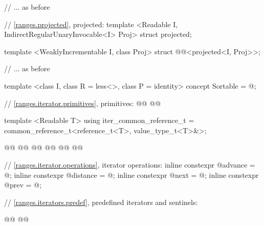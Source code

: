 \begin{codeblock}
{{    // ... as before

    // \ref{ranges.projected}, projected:
    template <Readable I, IndirectRegularUnaryInvocable<I> Proj>
    struct projected;

    template <WeaklyIncrementable I, class Proj>
    struct @@<projected<I, Proj>>;

    // ... as before

    template <class I, class R = less<>, class P = identity>
    concept Sortable = @\seebelow@;

    // \ref{ranges.iterator.primitives}, primitives:
    @@
    @@

    template <Readable T> using iter_common_reference_t
      = common_reference_t<reference_t<T>, value_type_t<T>&>;

    @@
    @@
    @@
    @@
    @@
    @@

    // \ref{ranges.iterator.operations}, iterator operations:
    inline constexpr @\unspec@ advance = @\unspec@;
    inline constexpr @\unspec@ distance = @\unspec@;
    inline constexpr @\unspec@ next = @\unspec@;
    inline constexpr @\unspec@ prev = @\unspec@;

    // \ref{ranges.iterators.predef}, predefined iterators and sentinels:

    @@
    @@

}}
\end{codeblock}
